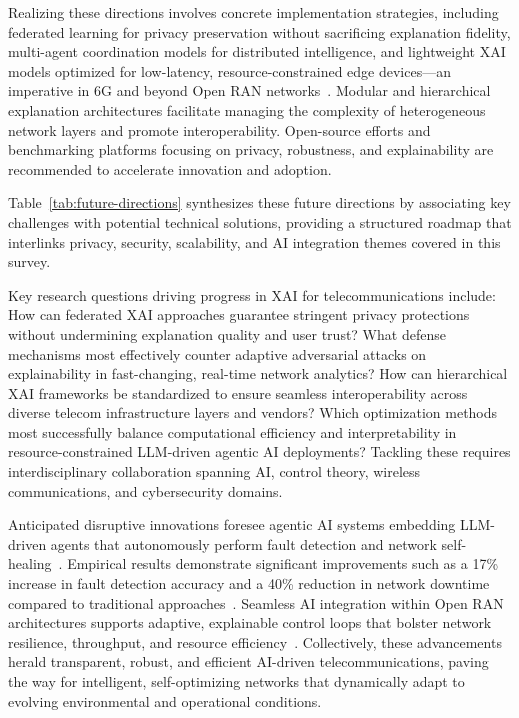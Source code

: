 \documentclass[sigconf]{acmart}
\begin{document}
Realizing these directions involves concrete implementation strategies, including federated learning for privacy preservation without sacrificing explanation fidelity, multi-agent coordination models for distributed intelligence, and lightweight XAI models optimized for low-latency, resource-constrained edge devices—an imperative in 6G and beyond Open RAN networks~\cite{ref54}. Modular and hierarchical explanation architectures facilitate managing the complexity of heterogeneous network layers and promote interoperability. Open-source efforts and benchmarking platforms focusing on privacy, robustness, and explainability are recommended to accelerate innovation and adoption.

Table~\ref{tab:future-directions} synthesizes these future directions by associating key challenges with potential technical solutions, providing a structured roadmap that interlinks privacy, security, scalability, and AI integration themes covered in this survey.

Key research questions driving progress in XAI for telecommunications include: How can federated XAI approaches guarantee stringent privacy protections without undermining explanation quality and user trust? What defense mechanisms most effectively counter adaptive adversarial attacks on explainability in fast-changing, real-time network analytics? How can hierarchical XAI frameworks be standardized to ensure seamless interoperability across diverse telecom infrastructure layers and vendors? Which optimization methods most successfully balance computational efficiency and interpretability in resource-constrained LLM-driven agentic AI deployments? Tackling these requires interdisciplinary collaboration spanning AI, control theory, wireless communications, and cybersecurity domains.

Anticipated disruptive innovations foresee agentic AI systems embedding LLM-driven agents that autonomously perform fault detection and network self-healing~\cite{ref55}. Empirical results demonstrate significant improvements such as a 17\% increase in fault detection accuracy and a 40\% reduction in network downtime compared to traditional approaches~\cite{ref55}. Seamless AI integration within Open RAN architectures supports adaptive, explainable control loops that bolster network resilience, throughput, and resource efficiency~\cite{ref54}. Collectively, these advancements herald transparent, robust, and efficient AI-driven telecommunications, paving the way for intelligent, self-optimizing networks that dynamically adapt to evolving environmental and operational conditions.
\end{document}

